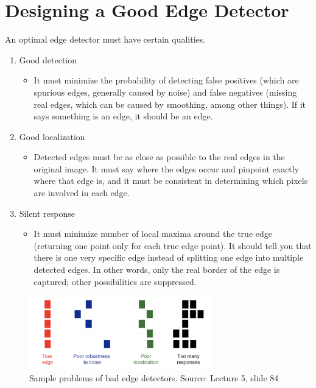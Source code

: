 \documentclass{article}
\begin{document}
\section{Designing a Good Edge Detector}
An optimal edge detector must have certain qualities.
\begin{enumerate}
    \item Good detection
    \begin{itemize}
        \item It must minimize the probability of detecting false positives (which are spurious edges, generally caused by noise) and false negatives (missing real edges, which can be caused by smoothing, among other things). If it says something is an edge, it should be an edge.
    \end{itemize}
    \item Good localization
    \begin{itemize}
        \item Detected edges must be as close as possible to the real edges in the original image. It must say where the edges occur and pinpoint exactly where that edge is, and it must be consistent in determining which pixels are involved in each edge.
    \end{itemize}
    \item Silent response
    \begin{itemize}
        \item It must minimize number of local maxima around the true edge (returning one point only for each true edge point). It should tell you that there is one very specific edge instead of splitting one edge into multiple detected edges. In other words, only the real border of the edge is captured; other possibilities are suppressed.
    \end{itemize}
\end{enumerate}

\begin{figure}[H]
\centering
\includegraphics[width=8cm]{fei-fei_detection.png}
\caption{Sample problems of bad edge detectors. Source: Lecture 5, slide 84}
\end{figure}


% 
% 
\end{document}
